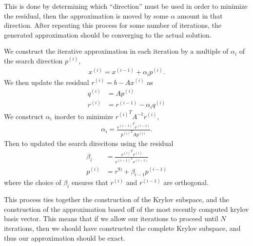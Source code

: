 \documentclass[../fem.tex]{subfiles}
\begin{document}
\begin{Figure}
   \begin{center}
     
   \end{center}
   \label{fig:cg_time}
\end{Figure}

This is done by determining which ``direction'' must be used in order to
minimize the residual, then the approximation is moved by some $\alpha$ amount
in that direction. After repeating this process for some number of iterations,
the generated approximation should be converging to the actual solution.

\begin{Figure}
   \begin{center}
     
   \end{center}
   \label{fig:cg_err}
\end{Figure}

We construct the iterative approximation in each iteration by a multiple of
$\alpha_i$ of the search direction $p^{(i)}$,
\begin{align*}
  x^{(i)}=x^{(i-1)}+\alpha_ip^{(i)}.
\end{align*}
We then update the residual $r^{(i)}=b-Ax^{(i)}$ as
\begin{align*}
  q^{(i)}&=Ap^{(i)}\\
  r^{(i)}&=r^{(i-1)}-\alpha_i q^{(i)}
\end{align*}
We construct $\alpha_i$ inorder to minimize ${r^{(i)}}^TA^{-1}r^{(i)}$,
\begin{align*}
  \alpha_i=\frac{{r^{(i-1)}}^Tr^{(i-1)}}{{p^{(i)}}^TAp^{(i)}}.
\end{align*}
Then to updated the search direcitons using the residual
\begin{align*}
  \beta_i&=\frac{{r^{(i)}}^Tr^{(i)}}{{r^{(i-1)}}^Tr^{(i-1)}}\\
  p^{(i)}&=r^{9)}+\beta_{i-1}p^{(i-1)}
\end{align*}
where the choice of $\beta_i$ ensures that $r^{(i)}$ and $r^{(i-1)}$ are
orthogonal.

This process ties together the construction of the Krylov subspace, and the
construction of the approximation based off of the most recently computed
krylov basis vector. This means that if we allow our iterations to proceed
until $N$ iterations, then we should have constructed the complete Krylov
subspace, and thus our approximation should be exact.
\end{document}
